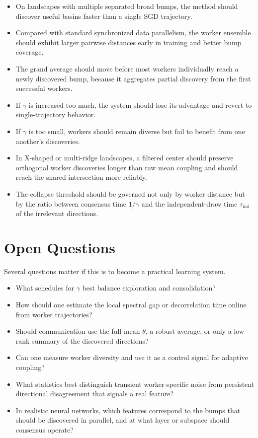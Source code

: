 \documentclass{article}
\begin{document}
\begin{itemize}
\item On landscapes with multiple separated broad bumps, the method
  should discover useful basins faster than a single SGD trajectory.
\item Compared with standard synchronized data parallelism, the worker
  ensemble should exhibit larger pairwise distances early in training
  and better bump coverage.
\item The grand average should move before most workers individually
  reach a newly discovered bump, because it aggregates partial discovery
  from the first successful workers.
\item If $\gamma$ is increased too much, the system should lose its
  advantage and revert to single-trajectory behavior.
\item If $\gamma$ is too small, workers should remain diverse but fail
  to benefit from one another's discoveries.
\item In X-shaped or multi-ridge landscapes, a filtered center should
  preserve orthogonal worker discoveries longer than raw mean coupling
  and should reach the shared intersection more reliably.
\item The collapse threshold should be governed not only by worker
  distance but by the ratio between consensus time $1/\gamma$ and the
  independent-draw time $\tau_{\mathrm{ind}}$ of the irrelevant
  directions.
\end{itemize}

\section{Open Questions}

Several questions matter if this is to become a practical learning
system.

\begin{itemize}
\item What schedules for $\gamma$ best balance exploration and
  consolidation?
\item How should one estimate the local spectral gap or decorrelation
  time online from worker trajectories?
\item Should communication use the full mean $\bar{\theta}$, a robust
  average, or only a low-rank summary of the discovered directions?
\item Can one measure worker diversity and use it as a control signal
  for adaptive coupling?
\item What statistics best distinguish transient worker-specific noise
  from persistent directional disagreement that signals a real feature?
\item In realistic neural networks, which features correspond to the
  bumps that should be discovered in parallel, and at what layer or
  subspace should consensus operate?
\end{itemize}
\end{document}
